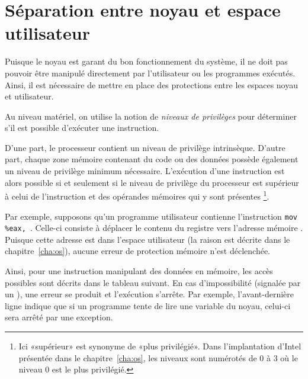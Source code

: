 \section{Séparation entre noyau et espace utilisateur}

Puisque le noyau est garant du bon fonctionnement du système, il ne doit pas
pouvoir être manipulé directement par l'utilisateur ou les programmes exécutés.
Ainsi, il est nécessaire de mettre en place des protections entre les espaces
noyau et utilisateur.

Au niveau matériel, on utilise la notion de \emph{niveaux de privilèges} pour
déterminer s'il est possible d'exécuter une instruction.

D'une part, le processeur contient un niveau de privilège intrinsèque. D'autre
part, \linebreak chaque zone mémoire contenant du code ou des données possède
également un niveau de privilège minimum nécessaire. L'exécution d'une
instruction est alors possible si et seulement si le niveau de privilège du
processeur est supérieur à celui de l'instruction et des opérandes mémoires qui
y sont présentes
\footnote{
  Ici «supérieur» est synonyme de «plus privilégié». Dans l'implantation
  d'Intel présentée dans le chapitre~\ref{cha:os}, les niveaux sont numérotés de
  0 à 3 où le niveau 0 est le plus privilégié.
}.

Par exemple, supposons qu'un programme utilisateur contienne l'instruction
\texttt{mov \%eax, }. Celle-ci consiste à déplacer le contenu du
registre \eax{} vers l'adresse mémoire \texttt{}. Puisque cette
adresse est dans l'espace utilisateur (la raison est décrite dans le
chapitre~\ref{cha:os}), aucune erreur de protection mémoire n'est déclenchée.


Ainsi, pour une instruction manipulant des données en mémoire, les accès
possibles sont décrits dans le tableau suivant. En cas d'impossibilité (signalée
par un \Square), une erreur se produit et l'exécution s'arrête. Par exemple,
l'avant-dernière ligne indique que si un programme tente de lire une variable du
noyau, celui-ci sera arrêté par une exception.

